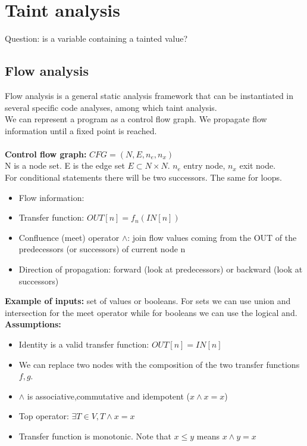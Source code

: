 \documentclass[10pt,a4paper]{book}
\begin{document}
\chapter{Taint analysis}
Question: is a variable containing a tainted value?
\section{Flow analysis}
Flow analysis is a general static analysis framework that can be instantiated in several specific code analyses, among which taint analysis.\\
We can represent a program as a control flow graph. We propagate flow information until a fixed point is reached.\\\\
\textbf{Control flow graph:} $CFG = (N,E,n_e,n_x)$\\
N is a node set. E is the edge set $E \subset N \times N$. $n_e$ entry node, $n_x$ exit node.\\
For conditional statements there will be two successors. The same for loops.
\begin{itemize}
\item Flow information: 
\item Transfer function: $OUT[n]= f_n(IN[n])$
\item Confluence (meet) operator $\wedge$: join flow values coming from the OUT of the predecessors (or successors) of current node n
\item Direction of propagation: forward (look at predecessors) or backward (look at successors)
\end{itemize}
\textbf{Example of inputs:} set of values or booleans. For sets we can use union and intersection for the meet operator while for booleans we can use the logical and.\\
\textbf{Assumptions:}
\begin{itemize}
\item Identity is a valid transfer function: $OUT[n] = IN[n]$\\
\item We can replace two nodes with the composition of the two transfer functions $f,g$.\\
\item $\wedge$ is associative,commutative and idempotent ($x \wedge x = x$)\\
\item Top operator: $\exists T \in V,T \wedge x = x$\\
\item Transfer function is monotonic. Note that $x \leq y$ means $x \wedge y = x$
\end{itemize}
\end{document}
